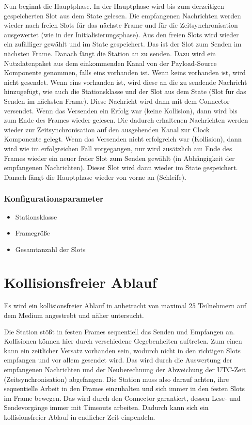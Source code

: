 \documentclass[draft=false
              ,paper=a4
              ,twoside=false
              ,fontsize=11pt
              ,headsepline
              ,BCOR10mm
              ,DIV11
              ]{scrbook}
\begin{document}
Nun beginnt die Hauptphase. In der Hauptphase wird bis zum derzeitigen gespeicherten Slot aus dem State gelesen. Die empfangenen Nachrichten werden wieder nach freien Slots für das nächste Frame und für die Zeitsynchronisation ausgewertet (wie in der Initialisierungsphase). Aus den freien Slots wird wieder ein zufälliger gewählt und im State gespeichert. Das ist der Slot zum Senden im nächsten Frame.
Danach fängt die Station an zu senden. Dazu wird ein Nutzdatenpaket aus dem einkommenden Kanal von der Payload-Source Komponente genommen, falls eins vorhanden ist. Wenn keins vorhanden ist, wird nicht gesendet.
Wenn eins vorhanden ist, wird diese an die zu sendende Nachricht hinzugefügt, wie auch die Stationsklasse und der Slot aus dem State (Slot für das Senden im nächsten Frame).
Diese Nachricht wird dann mit dem Connector versendet.
Wenn das Versenden ein Erfolg war (keine Kollision), dann wird bis zum Ende des Frames wieder gelesen. Die dadurch erhaltenen Nachrichten werden wieder zur Zeitsynchronisation auf den ausgehenden Kanal zur Clock Komponente gelegt.
Wenn das Versenden nicht erfolgreich war (Kollision), dann wird wie im erfolgreichen Fall vorgegangen, nur wird zusätzlich am Ende des Frames wieder ein neuer freier Slot zum Senden gewählt (in Abhängigkeit der empfangenen Nachrichten). Dieser Slot wird dann wieder im State gespeichert.
Danach fängt die Hauptphase wieder von vorne an (Schleife).

\subsection{Konfigurationsparameter}
\begin{itemize}
    \item Stationsklasse
    \item Framegröße
    \item Gesamtanzahl der Slots
\end{itemize}

\chapter{Kollisionsfreier Ablauf}
Es wird ein kollisionsfreier Ablauf in anbetracht von maximal 25 Teilnehmern auf dem Medium angestrebt und näher untersucht.

Die Station stößt in festen Frames sequentiell das Senden und Empfangen an. Kollisionen können hier durch verschiedene Gegebenheiten auftreten.
Zum einen kann ein zeitlicher Versatz vorhanden sein, wodurch nicht in den richtigen Slots empfangen und vor allem gesendet wird. Das wird durch die Auswertung der empfangenen Nachrichten und der Neuberechnung der Abweichung der UTC-Zeit (Zeitsynchronisation) abgefangen.
Die Station muss also darauf achten, ihre sequentielle Arbeit in den Frames einzuhalten und sich immer in den festen Slots im Frame bewegen. Das wird durch den Connector garantiert, dessen Lese- und Sendevorgänge immer mit Timeouts arbeiten. Dadurch kann sich ein kollisionsfreier Ablauf in endlicher Zeit einpendeln.
\end{document}
